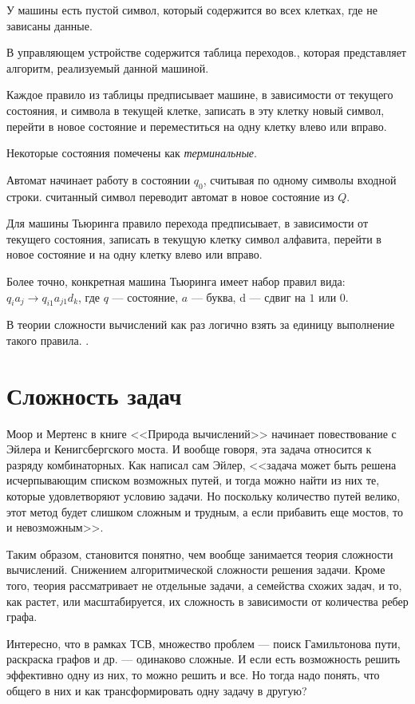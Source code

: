 \documentclass{article}
\begin{document}
У машины есть пустой символ, который содержится во всех клетках, где не зависаны данные.

В управляющем устройстве содержится таблица переходов., которая представляет алгоритм, реализуемый данной машиной.

Каждое правило из таблицы предписывает машине, в зависимости от текущего состояния, и символа в текущей клетке, записать в эту клетку новый символ, перейти в новое состояние и переместиться на одну клетку влево или вправо.

Некоторые состояния помечены как \textit{терминальные}. 

Автомат начинает работу в состоянии $q_0$, считывая по одному символы входной строки. считанный символ переводит автомат в новое состояние из $Q$. 

Для машины Тьюринга правило перехода предписывает, в зависимости от текущего состояния, записать в текущую клетку символ алфавита, перейти в новое состояние и на одну клетку влево или вправо.

Более точно, конкретная машина Тьюринга имеет набор правил вида: 
${q_i}{a_j}\to {q_{i1}}{a_{j1}}{d_k}$, 
где $q$ --- состояние, $a$ --- буква, d --- сдвиг на $1$ или $0$.

В теории сложности вычислений как раз логично взять за единицу выполнение такого правила.
\cite{wikituring}.

\section{Сложность задач}
Моор и Мертенс в книге <<Природа вычислений>>\cite{moor} начинает повествование с Эйлера и Кенигсбергского моста.
И вообще говоря, эта задача относится к разряду комбинаторных. Как написал сам Эйлер, <<задача может быть решена исчерпывающим списком возможных путей, и тогда можно найти из них те, которые удовлетворяют условию задачи. Но поскольку количество путей велико, этот метод будет слишком сложным и трудным, а если прибавить еще мостов, то и невозможным>>.

Таким образом, становится понятно, чем вообще занимается теория сложности вычислений. Снижением алгоритмической сложности решения задачи. Кроме того, теория рассматривает не отдельные задачи, а семейства схожих задач, и то, как растет, или масштабируется, их сложность  в зависимости от количества ребер графа.

Интересно, что в рамках ТСВ, множество проблем --- поиск Гамильтонова пути, раскраска графов и др. --- одинаково сложные. И если есть возможность решить эффективно одну из них, то можно решить и все. Но тогда надо понять, что общего в них и как трансформировать одну задачу в другую?
\end{document}
